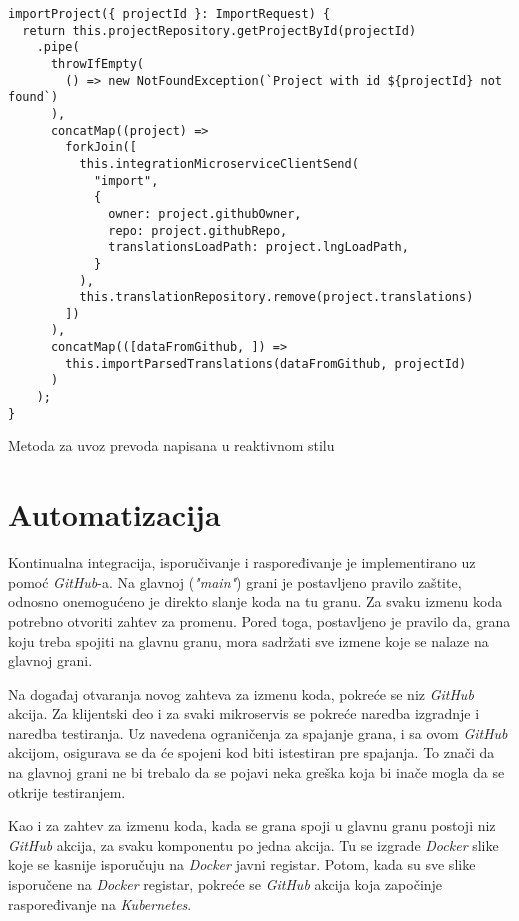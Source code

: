 \begin{listing}[h]
  \centering
  \begin{verbatim}
importProject({ projectId }: ImportRequest) {
  return this.projectRepository.getProjectById(projectId)
    .pipe(
      throwIfEmpty(
        () => new NotFoundException(`Project with id ${projectId} not found`)
      ),
      concatMap((project) =>
        forkJoin([
          this.integrationMicroserviceClientSend(
            "import",
            {
              owner: project.githubOwner,
              repo: project.githubRepo,
              translationsLoadPath: project.lngLoadPath,
            }
          ),
          this.translationRepository.remove(project.translations)
        ])
      ),
      concatMap(([dataFromGithub, ]) =>
        this.importParsedTranslations(dataFromGithub, projectId)
      )
    );
}  
  \end{verbatim}
\caption{Metoda za uvoz prevoda napisana u reaktivnom stilu}
\label{code:rxjs}
\end{listing}


\section{Automatizacija}
Kontinualna integracija, isporučivanje i raspoređivanje je implementirano uz 
pomoć \textit{GitHub}-a. Na glavnoj (\textit{"main"}) grani 
je postavljeno pravilo zaštite, odnosno onemogućeno je direkto slanje 
koda na tu granu. Za svaku izmenu koda potrebno otvoriti zahtev za 
promenu. Pored toga, postavljeno je pravilo da, grana koju treba spojiti 
na glavnu granu, mora sadržati sve izmene koje se nalaze na glavnoj grani.

Na događaj otvaranja novog zahteva za izmenu koda, pokreće se niz 
\textit{GitHub} akcija. Za klijentski deo i za svaki mikroservis 
se pokreće naredba izgradnje i naredba testiranja. Uz navedena 
ograničenja za spajanje grana, i sa ovom \textit{GitHub} akcijom, 
osigurava se da će spojeni kod biti istestiran pre spajanja. To znači da 
na glavnoj grani ne bi trebalo da se pojavi neka greška koja bi inače mogla 
da se otkrije testiranjem.

Kao i za zahtev za izmenu koda, kada se grana spoji u glavnu granu 
postoji niz \textit{GitHub} akcija, za svaku komponentu po jedna akcija.
Tu se izgrade \textit{Docker} slike koje se kasnije isporučuju na 
\textit{Docker} javni registar. Potom, kada su sve slike isporučene na 
\textit{Docker} registar, pokreće se \textit{GitHub} akcija koja započinje 
raspoređivanje na \textit{Kubernetes}.


